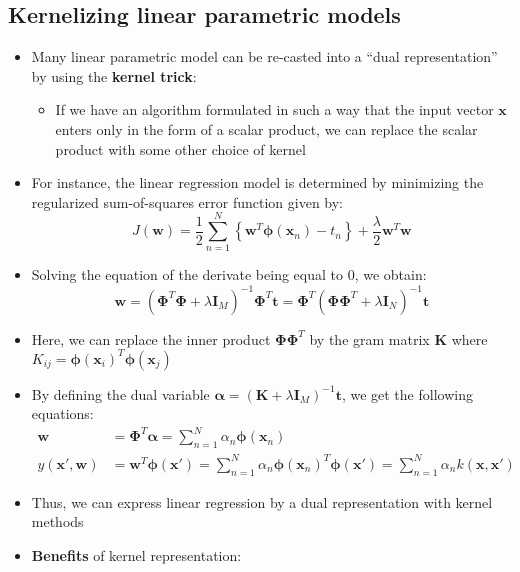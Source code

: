 \subsection{Kernelizing linear parametric models}
\begin{itemize}
	\item Many linear parametric model can be re-casted into a ``dual representation'' by using the \textbf{kernel trick}: 
	\begin{itemize}
		\item If we have an algorithm formulated in such a way that the input vector $\bm{x}$ enters only in the form of a scalar product, we can replace the scalar product with some other choice of kernel
	\end{itemize}
	\item For instance, the linear regression model is determined by minimizing the regularized sum-of-squares error function given by:
	$$J(\bm{w}) = \frac{1}{2}\sum\limits_{n=1}^{N} \left\{\bm{w}^T \bm{\phi}\left(\bm{x}_n\right) - t_n \right\} + \frac{\lambda}{2}\bm{w}^T \bm{w}$$
	\item Solving the equation of the derivate being equal to 0, we obtain:
	$$\bm{w} = \left(\bm{\Phi}^T\bm{\Phi} +\lambda \bm{I}_M\right)^{-1}\bm{\Phi}^T\bm{t} = \bm{\Phi}^T\left(\bm{\Phi}\bm{\Phi}^T +\lambda \bm{I}_N\right)^{-1}\bm{t} $$
	\item Here, we can replace the inner product $\bm{\Phi}\bm{\Phi}^T$ by the gram matrix $\bm{K}$ where $K_{ij} = \bm{\phi}(\bm{x}_i)^T\bm{\phi}(\bm{x}_j)$
	\item By defining the dual variable $\bm{\alpha} = \left(\bm{K} +\lambda \bm{I}_M\right)^{-1}\bm{t}$, we get the following equations:
	\begin{equation*}
		\begin{split}
			\bm{w} & =\bm{\Phi}^T \bm{\alpha} = \sum\limits_{n=1}^{N} \alpha_n \bm{\phi}(\bm{x}_n)\\
			y\left(\bm{x}',\bm{w}\right) & = \bm{w}^T \bm{\phi}(\bm{x}') = \sum\limits_{n=1}^{N} \alpha_n \bm{\phi}\left(\bm{x}_n\right)^T \bm{\phi}\left(\bm{x}'\right) = \sum\limits_{n=1}^{N} \alpha_n k\left(\bm{x},\bm{x}'\right)
		\end{split}
	\end{equation*}
	\item Thus, we can express linear regression by a dual representation with kernel methods
	\item \textbf{Benefits} of kernel representation:
	\begin{itemize}

\end{itemize}
\end{itemize}
